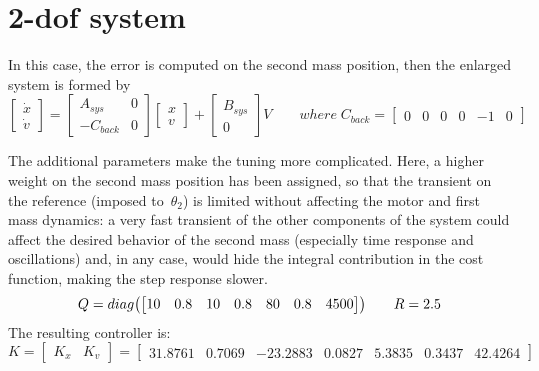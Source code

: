 \section{\acrshort{2-dof} system}

In this case, the error is computed on the second mass position, then the enlarged system is formed by
\begin{equation}
	\begin{bmatrix}
		\dot{x} \\
		\dot{v}
	\end{bmatrix}
	=
	\begin{bmatrix}
		A_{sys} & 0 \\
		-C_{back} & 0
	\end{bmatrix}
	\begin{bmatrix}
		x \\
		v
	\end{bmatrix}
	+
	\begin{bmatrix}
		B_{sys} \\
		0
	\end{bmatrix}
	V
	\qquad
	where \; C_{back} =
	\begin{bmatrix}
		0 & 0 & 0 & 0 & -1 & 0
	\end{bmatrix}
\end{equation}

The additional parameters make the tuning more complicated. Here, a higher weight on the second mass position has been assigned, so that the transient on the reference (imposed to~$\theta_2$) is limited without affecting the motor and first mass dynamics: a very fast transient of the other components of the system could affect the desired behavior of the second mass (especially time response and oscillations) and, in any case, would hide the integral contribution in the cost function, making the step response slower.
\[
	Q = diag
	\bigl{(}
	\begin{bmatrix}
		10 & 0.8 & 10 & 0.8 & 80 & 0.8 & 4500
	\end{bmatrix}
	\bigr{)}
	\qquad
	R = 2.5
\]
The resulting controller is:
\begin{equation}
	K =
	\left[
	\begin{array}{c|c}
		K_x & K_v
	\end{array}
	\right]
	=
	\left[
	\begin{array}{cccccc|c}
		31.8761 & 0.7069 & -23.2883 & 0.0827 & 5.3835 & 0.3437 & 42.4264
	\end{array}
	\right]
	\label{eq:2dof_LQ_fastK}
\end{equation}

